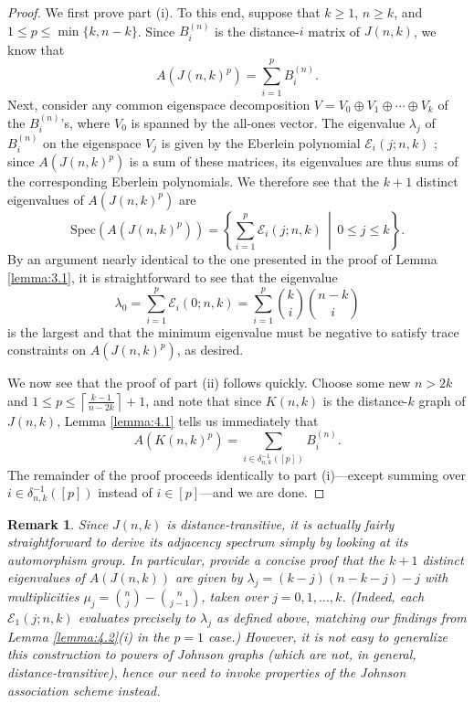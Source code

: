 \documentclass{article}
\def\Ein{\mathcal{E}}
\numberwithin{equation}{section}
\theoremstyle{plain}
\newtheorem{remark}[theorem]{Remark}
\begin{document}
\begin{proof}
    We first prove part (i). To this end, suppose that $k \ge 1$, $n \ge k$, and $1 \le p \le \min\{k, n - k\}$. Since $B_i^{(n)}$ is the distance-$i$ matrix of $J(n, k)$, we know that
    \[A(J(n, k)^p) = \sum_{i = 1}^p B_i^{(n)}.\]
    Next, consider any common eigenspace decomposition $V = V_0 \oplus V_1 \oplus \cdots \oplus V_k$ of the $B_i^{(n)}$'s, where $V_0$ is spanned by the all-ones vector. The eigenvalue $\lambda_j$ of $B_i^{(n)}$ on the eigenspace $V_j$ is given by the Eberlein polynomial $\Ein_i(j; n, k)$ \cite[p. 220]{BI84}; since $A(J(n, k)^p)$ is a sum of these matrices, its eigenvalues are thus sums of the corresponding Eberlein polynomials. We therefore see that the $k + 1$ distinct eigenvalues of $A(J(n, k)^p)$ are
    \[\mathrm{Spec}(A(J(n, k)^p)) = \left\{\sum_{i = 1}^p \Ein_i(j; n, k)\, \middle|\, 0 \le j \le k\right\}.\]
     By an argument nearly identical to the one presented in the proof of Lemma \ref{lemma:3.1}, it is straightforward to see that the eigenvalue
    \[\lambda_0 = \sum_{i = 1}^p \Ein_i(0; n, k) = \sum_{i = 1}^p \binom{k}{i} \binom{n - k}{i}\]
    is the largest and that the minimum eigenvalue must be negative to satisfy trace constraints on $A(J(n, k)^p)$, as desired.

    We now see that the proof of part (ii) follows quickly. Choose some new $n > 2k$ and $1 \le p \le \left\lceil\frac{k - 1}{n - 2k}\right\rceil + 1$, and note that since $K(n, k)$ is the distance-$k$ graph of $J(n, k)$, Lemma \ref{lemma:4.1} tells us immediately that
    \[A(K(n, k)^p) = \sum_{i \in \delta_{n,k}^{-1}([p])} B_i^{(n)}.\]
    The remainder of the proof proceeds identically to part (i)---except summing over $i \in \delta_{n,k}^{-1}([p])$ instead of $i \in [p]$---and we are done.
\end{proof}

\begin{remark}\label{remark:4.3}
    Since $J(n, k)$ is distance-transitive, it is actually fairly straightforward to derive its adjacency spectrum simply by looking at its automorphism group. In particular, \cite[pp. 255--256]{BCN89} provide a concise proof that the $k + 1$ distinct eigenvalues of $A(J(n, k))$ are given by $\lambda_j = (k - j)(n - k - j) - j$ with multiplicities $\mu_j = \binom{n}{j} - \binom{n}{j - 1}$, taken over $j = 0, 1, \ldots, k$. (Indeed, each $\Ein_1(j; n, k)$ evaluates precisely to $\lambda_j$ as defined above, matching our findings from Lemma \ref{lemma:4.2}(i) in the $p = 1$ case.) However, it is not easy to generalize this construction to powers of Johnson graphs (which are not, in general, distance-transitive), hence our need to invoke properties of the Johnson association scheme instead.
\end{remark}
\end{document}
